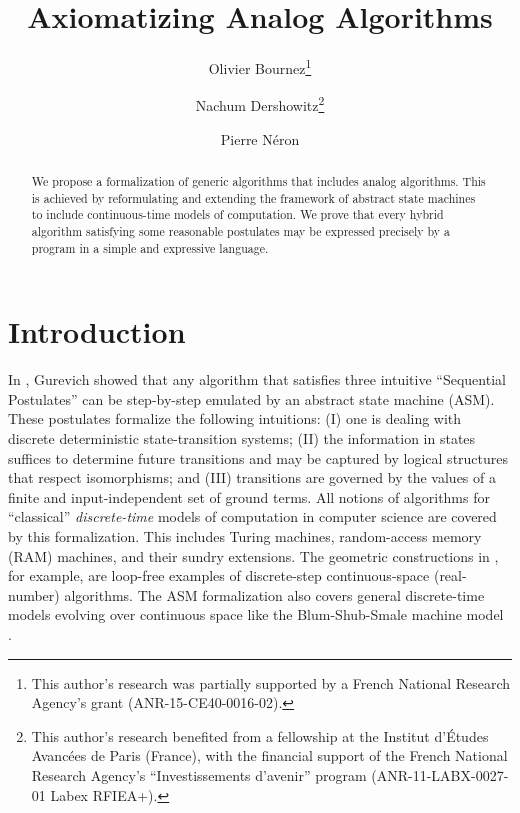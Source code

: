 \documentclass[envcountsame]{llncs}
\begin{document}
\title{Axiomatizing Analog Algorithms}
\author{Olivier Bournez\thanks{This author's research was
    partially supported by a French National Research
    Agency's grant (ANR-15-CE40-0016-02).}
  \and Nachum
  Dershowitz\thanks{This author's research benefited from
    a fellowship at the Institut d'\'Etudes Avanc\'ees de Paris
    (France), with the financial support of the French National Research Agency's ``Investissements
    d'avenir'' program (ANR-11-LABX-0027-01 Labex RFIEA+).}
\and Pierre N\'eron}

\maketitle

\begin{abstract}
  We propose a formalization of generic algorithms that includes analog
  algorithms.  This is achieved by reformulating and extending the framework of abstract
  state machines to include continuous-time models of computation.
     {We prove that every hybrid algorithm satisfying some reasonable postulates   may be expressed precisely by
   a program in a simple and expressive language.}
\end{abstract}

\section{Introduction}

In \cite{Gur00}, Gurevich showed
that any algorithm that satisfies three intuitive ``Sequential
Postulates'' can be step-by-step emulated by an {abstract state machine (ASM)}.  These postulates
formalize the following intuitions: (I) one is dealing with
discrete deterministic state-transition systems; (II) the information in states
suffices to determine future transitions and may be captured by
logical structures that respect isomorphisms; and (III) transitions
are governed by the values of a finite and input-independent set of
ground
terms.
All notions of algorithms for ``classical'' \emph{discrete-time} models of
computation in computer science are covered by this formalization.
This includes Turing machines, random-access memory (RAM) machines,
and their sundry extensions.
The geometric constructions in \cite{Reisig}, for example, are
loop-free examples of discrete-step continuous-space (real-number) algorithms.
The ASM formalization also covers general discrete-time models evolving over continuous
space like the Blum-Shub-Smale machine model \cite{BSS}.
\end{document}
